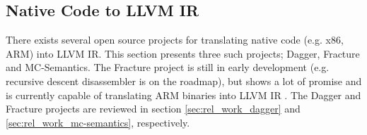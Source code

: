 
\subsection{Native Code to LLVM IR}
\label{sec:rel_work_native_code_to_llvm_ir}

There exists several open source projects for translating native code (e.g. x86, ARM) into LLVM IR. This section presents three such projects; Dagger, Fracture and MC-Semantics. The Fracture project is still in early development (e.g. recursive descent disassembler is on the roadmap), but shows a lot of promise and is currently capable of translating ARM binaries into LLVM IR \cite{fracture}. The Dagger and Fracture projects are reviewed in section \ref{sec:rel_work_dagger} and \ref{sec:rel_work_mc-semantics}, respectively.




